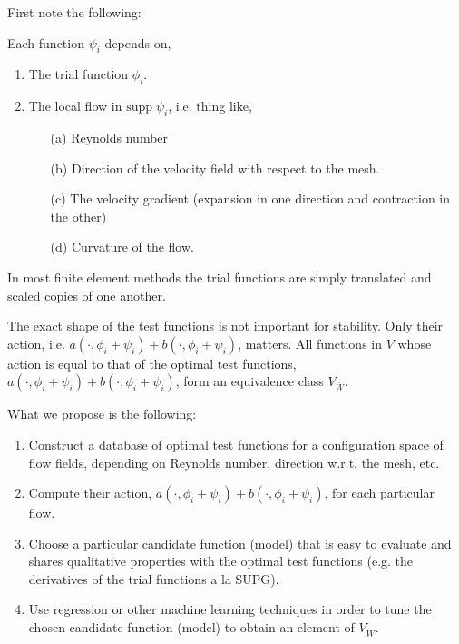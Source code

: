 First note the following:
\begin{remark} Each function $\psi_i$ depends on,
	\begin{enumerate} 
		\item The trial function $\phi_i$.
		\item The local flow in $\mathrm{supp} \; \psi_i$, i.e. thing like,
		\begin{enumerate} 
			\item[(a)] Reynolds number
			\item[(b)] Direction of the velocity field with respect to the mesh.
			\item[(c)] The velocity gradient (expansion in one direction and contraction in the other)
			\item[(d)] Curvature of the flow.
		\end{enumerate}
	\end{enumerate}
\end{remark}
\begin{remark} In most finite element methods the trial functions are simply translated and scaled copies of one another.
\end{remark}

\begin{remark} The exact shape of the test functions is not important for stability. Only their action, i.e. $a(\cdot, \phi_i+\psi_i) + b(\cdot, \phi_i+\psi_i)$, matters. All functions in $V$ whose action is equal to that of the optimal test functions, $a(\cdot, \phi_i+\psi_i) + b(\cdot, \phi_i+\psi_i)$, form an equivalence class $V_{\overline{W}}$.
\end{remark}

What we propose is the following:
\begin{enumerate} 
	\item Construct a database of optimal test functions for a configuration space of flow fields, depending on Reynolds number, direction w.r.t. the mesh, etc.
	\item Compute their action, $a(\cdot, \phi_i+\psi_i) + b(\cdot, \phi_i+\psi_i)$, for each particular flow.
	\item Choose a particular candidate function (model) that is easy to evaluate and shares qualitative properties with the optimal test functions (e.g. the derivatives of the trial functions a la SUPG).
	\item Use regression or other machine learning techniques in order to tune the chosen candidate function (model) to obtain an element of $V_{\overline{W}}$.
\end{enumerate}

